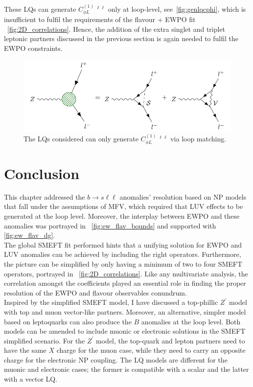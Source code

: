 These LQs can generate $C_{\phi L}^{(1)}\ ^{\ell\ell}$ only at loop-level, see~\autoref{fig:genlqcphi}, which is insufficient to fulfil the requirements of the flavour + EWPO fit ~\autoref{fig:2D_correlations}. Hence, the addition of the extra singlet and triplet leptonic partners discussed in the previous section is again needed to fulfil the EWPO constraints.
\begin{figure}[htpb!]
	\centering 
	\includegraphics[width=\linewidth]{figures/LQ_tri}
	\caption{The LQs considered can only generate  $C_{\phi L}^{(1)}\ ^{\ell\ell}$ via loop matching. }    
	\label{fig:genlqcphi}
\end{figure}
\section{Conclusion}
\label{sec:sum}
This chapter addressed the $b \to s \ell \ell $ anomalies' resolution based on NP models that fall under the assumptions of MFV, which required that LUV effects to be generated at the loop level.  Moreover, the interplay between EWPO and these anomalies was portrayed in ~\autoref{fig:ew_flav_bounds} and supported with \autoref{fig:ew_flav_dg}. \\

The global SMEFT fit performed hints that a unifying solution for EWPO and LUV anomalies can be achieved by including the right operators. Furthermore, the picture can be simplified by only having a minimum of two to four SMEFT operators, portrayed in ~\autoref{fig:2D_correlations}. Like any multivariate analysis, the correlation amongst the coefficients played an essential role in finding the proper resolution of the EWPO and flavour observables conundrum. \\ 
Inspired by the simplified SMEFT model, I have discussed a top-phillic $Z^\prime$ model with top and muon vector-like partners. Moreover, an alternative, simpler model based on leptoquarks can also produce the $B$ anomalies at the loop level. Both models can be amended to include muonic or electronic solutions in the SMEFT simplified scenario. For the $Z^\prime$ model, the top-quark and lepton partners need to have the same $X$ charge for the muon case, while they need to carry an opposite charge for the electronic NP coupling.  The LQ models are different for the muonic and electronic cases; the former is compatible with a scalar and the latter with a vector LQ. \\ 

